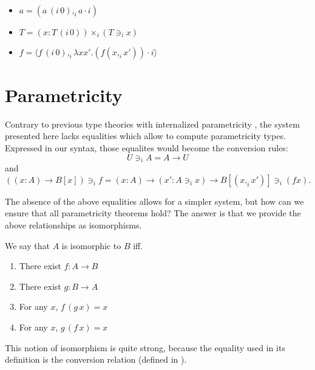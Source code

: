 \documentclass[english]{PaperTools/latex/lipics}
\newcommand\CP[3]{(#2,_{#1} #3)}
\newcommand\CTimes[2]{(#2) ×_{#1}}
\newcommand\param[1]{\!\cdot\!#1}
\newcommand\op[1]{∋_{#1}}
\newcommand\fp[3]{⟨#2 ,_{#1} #3⟩}
\newcommand\mor[2]{({#1}\,{#2})}
\newcommand\proj[2]{{#2}\,\mor{#1}0}
\begin{document}
\begin{corollary}~
  \label{cor:equalities}
  \begin{itemize}
  \item $a = \CP i {\proj i a} {a \param i}$
  \item $T = \CTimes i {x:\proj i T} {(T \op i x)}$
  \item $f = \fp i {\proj i f} {λx x'. (f \CP i x {x'}) \param i}$
  \end{itemize}
\end{corollary}

\section{Parametricity}
\label{sec:parametricity}

Contrary to previous type theories with internalized parametricity
\citep{bernardy_computational_2012, bernardy_type-theory_2013}, the
system presented here lacks equalities which allow to compute
parametricity types. Expressed in our syntax, those equalites would become the conversion rules:
$$U \op i A = A → U$$
and
$$((x:A) → B[x]) \op i f = (x:A) → (x' : A \op i x) → B[\CP i x {x'}] \op i (f x).$$

The absence of the above equalities allows for a simpler system, but
how can we ensure that all parametricity theorems hold?  The answer is
that we provide the above relationships as isomorphisms.

We say that $A$ is isomorphic to $B$ iff.
\begin{enumerate}
  \item There exist $f : A → B$
  \item There exist $g : B → A$
  \item For any $x$, $f\, (g\, x) = x$
  \item For any $x$, $g\, (f\, x) = x$
\end{enumerate}
This notion of isomorphism is quite strong, because the equality
used in its definition is the conversion relation (defined in
).
\end{document}
